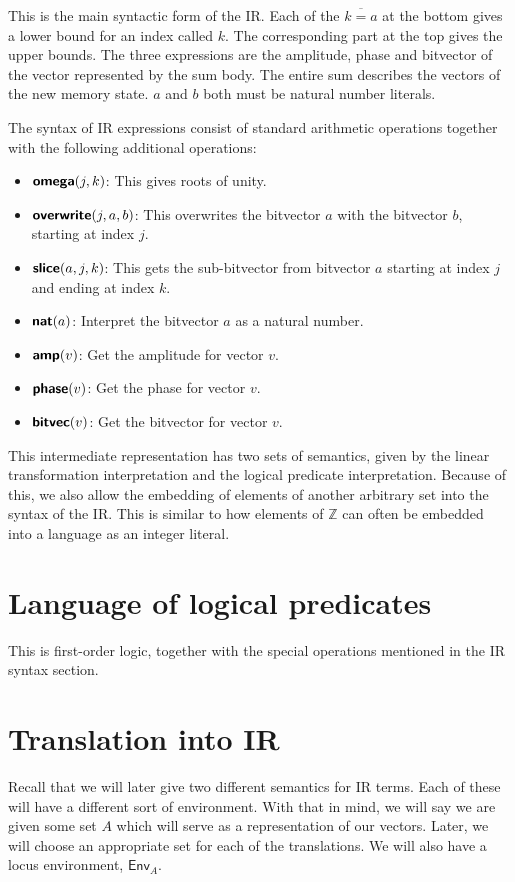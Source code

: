 \documentclass[runningheads]{llncs}
\newcommand {\Env} {\textsf{Env}}
\newcommand {\ir} [1] {\textsf{\textbf{#1}}}
\newcommand {\irOverwrite} {\ir{overwrite}}
\newcommand {\irSlice} {\ir{slice}}
\newcommand {\irNat} {\ir{nat}}
\newcommand {\irAmp} {\ir{amp}}
\newcommand {\irPhase} {\ir{phase}}
\newcommand {\irBV} {\ir{bitvec}}
\newcommand {\irOmega} {\ir{omega}}
\begin{document}
This is the main syntactic form of the IR. Each of the $\overline{k=a}$ at the bottom gives a lower bound for an index called $k$. The corresponding part at the top gives the upper bounds.
The three expressions are the amplitude, phase and bitvector of the vector represented by the sum body. The entire sum describes the vectors of the new memory state. $a$ and $b$ both must be natural number literals.

The syntax of IR expressions consist of standard arithmetic operations together with the following additional operations:

\begin{itemize}
  \item $\irOmega(j, k)$: This gives roots of unity.
  \item $\irOverwrite(j, a, b)$: This overwrites the bitvector $a$ with the bitvector $b$, starting at index $j$.
  \item $\irSlice(a, j, k)$: This gets the sub-bitvector from bitvector $a$ starting at index $j$ and ending at index $k$.
  \item $\irNat(a)$: Interpret the bitvector $a$ as a natural number.
  \item $\irAmp(v)$: Get the amplitude for vector $v$.
  \item $\irPhase(v)$: Get the phase for vector $v$.
  \item $\irBV(v)$: Get the bitvector for vector $v$.
\end{itemize}

This intermediate representation has two sets of semantics, given by the linear transformation interpretation and the logical predicate interpretation. Because of this, we also allow the embedding of elements of another arbitrary set into the syntax of the IR. This is similar to how elements of $\mathbb{Z}$ can often be embedded into a language as an integer literal.

\section{Language of logical predicates}

This is first-order logic, together with the special operations mentioned in the IR syntax section.

\section{Translation into IR}

Recall that we will later give two different semantics for IR terms. Each of these will have a different sort of environment. With that in mind, we will say we are given some set $A$ which will serve as a representation of our vectors. Later, we will choose an appropriate set for each of the translations. We will also have a locus environment, $\Env_A$.
\end{document}
